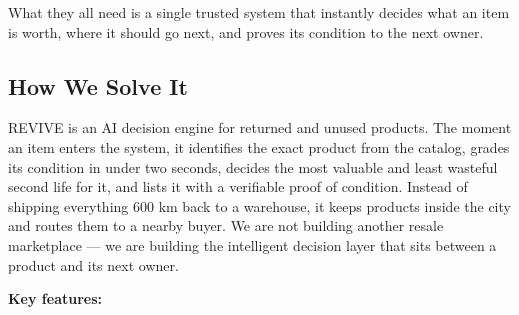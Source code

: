\documentclass[11pt]{article}
\newcommand{\placeholder}[1]{{\color{placeGray} #1}}
\begin{document}
\placeholder{What they all need is a single trusted system that instantly decides what an item is worth, where it should go next, and proves its condition to the next owner.}

\subsection{How We Solve It}
\placeholder{REVIVE is an AI decision engine for returned and unused products. The moment an item enters the system, it identifies the exact product from the catalog, grades its condition in under two seconds, decides the most valuable and least wasteful second life for it, and lists it with a verifiable proof of condition. Instead of shipping everything 600 km back to a warehouse, it keeps products inside the city and routes them to a nearby buyer. We are not building another resale marketplace --- we are building the intelligent decision layer that sits between a product and its next owner.}

\vspace{6pt}
\textbf{Key features:}
\end{document}

